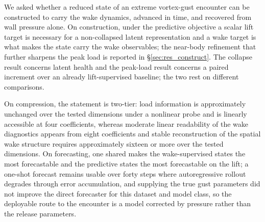 We asked whether a reduced state of an extreme vortex-gust encounter can be constructed to carry the wake dynamics, advanced in time, and recovered from wall pressure alone. On construction, under the predictive objective a scalar lift target is necessary for a non-collapsed latent representation and a wake target is what makes the state carry the wake observables; the near-body refinement that further sharpens the peak load is reported in \S\ref{sec:res_construct}. The collapse result concerns latent health and the peak-load result concerns a paired increment over an already lift-supervised baseline; the two rest on different comparisons.\re

On compression, the statement is two-tier: load information is approximately unchanged over the tested dimensions under a nonlinear probe and is linearly accessible at four coefficients, whereas moderate linear readability of the wake diagnostics appears from eight coefficients and stable reconstruction of the spatial wake structure requires approximately sixteen or more over the tested dimensions. On forecasting, one shared \DirectFC{} makes the wake-supervised states the most forecastable and the predictive states the most forecastable on the lift; a one-shot forecast remains usable over forty steps where autoregressive rollout degrades through error accumulation, and supplying the true gust parameters did not improve the direct forecaster for this dataset and model class, so the deployable route to the encounter is a model corrected by pressure rather than the release parameters.\re

